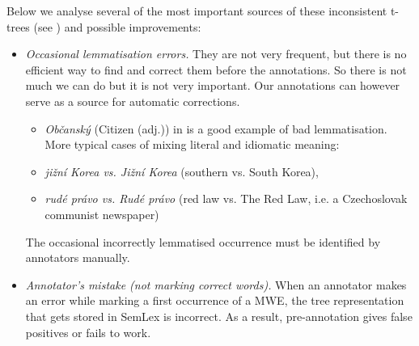 Below we analyse several of the most important sources of these inconsistent t-trees (see ) and possible improvements:
\begin{itemize}
%
\item \emph{Occasional lemmatisation errors.} They are not very frequent, but there is no efficient way to find and correct them before the annotations. So there is not much we can do but it is not very important. Our annotations can however serve as a source for automatic corrections.
	\begin{itemize}
	\item \textit{Občanský} (Citizen (adj.)) in  is a good example of bad lemmatisation. More typical cases of mixing literal and idiomatic meaning:
	\item \textit{jižní Korea {\rm vs.} Jižní Korea} (southern vs. South Korea),
	\item \emph{rudé právo {\rm vs.} Rudé právo} (red law vs. The Red Law, i.e. a Czechoslovak communist newspaper)
	\end{itemize}
	The occasional incorrectly lemmatised occurrence must be identified by annotators manually. 
\item \emph{Annotator's mistake (not marking correct words).} When an annotator makes an error while marking a first occurrence of a MWE, the tree representation that gets stored in SemLex is incorrect. As a result, pre-annotation gives false positives or fails to work. 


\end{itemize}
